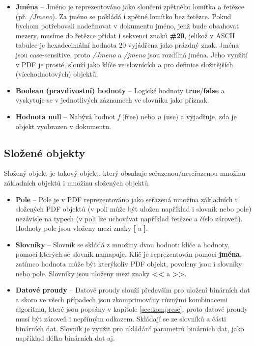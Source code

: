 \begin{itemize}
		\item \textbf{Jména} -- Jméno je reprezentováno jako sloučení zpětného lomítka a řetězce (př. \textit{/Jmeno}). Za jméno se pokládá i zpětné lomítko bez řetězce. Pokud bychom potřebovali nadefinovat v dokumentu jméno, jenž bude obsahovat mezery, musíme do řetězce přidat i sekvenci znaků \textbf{\#20}, jelikož v ASCII tabulce je hexadecimální hodnota 20 vyjádřena jako prázdný znak. Jména jsou case-sensitive, proto \textit{/Jmeno} a \textit{/jmeno} jsou rozdílná jména. Jeho využití v PDF je prosté, slouží jako klíče ve slovnících a pro definice složitějších (vícehodnotových) objektů.
		\item \textbf{Boolean (pravdivostní) hodnoty} -- Logické hodnoty \textbf{true}/\textbf{false} a vyskytuje se v jednotlivých záznamech ve slovníku jako příznak.
		\item \textbf{Hodnota null} -- Nabývá hodnot \textit{f} (free) nebo \textit{n} (use) a vyjadřuje, zda je objekt vyobrazen v dokumentu.
	\end{itemize}
\subsection{Složené objekty}	
Složený objekt je takový objekt, který obsahuje seřazenou/neseřazenou množinu základních objektů i množinu složených objektů.
	\begin{itemize}
		\item \textbf{Pole} -- Pole je v PDF reprezentováno jako seřazená množina základních i složených PDF objektů (v poli může být uložen například i slovník nebo pole) nezávisle na typech (v poli lze uchovávat například řetězec a číslo zároveň). Hodnoty pole jsou vloženy mezi znaky \textbf{[} a \textbf{]}.
		\item \textbf{Slovníky} -- Slovník se skládá z množiny dvou hodnot: klíče a hodnoty, pomocí kterých se slovník namapuje. Klíč je reprezentován pomocí \textbf{jména}, zatímco hodnota může být kterýkoliv PDF objekt, povoleny jsou i slovníky nebo pole. Slovníky jsou uloženy mezi znaky \textbf{<<} a \textbf{>>}.
		\item \textbf{Datové proudy} -- Datové proudy slouží především pro uložení binárních dat a skoro ve všech případech jsou zkomprimovány různými kombinacemi algoritmů, které jsou popsány v kapitole \ref{sec:komprese}, proto datové proudy musí být zároveň i nepřímým odkazem. Skládají se ze slovníků a části binárních dat. Slovník je využit pro ukládání parametrů binárních dat, jako například délka binárních dat aj.
	\end{itemize}
